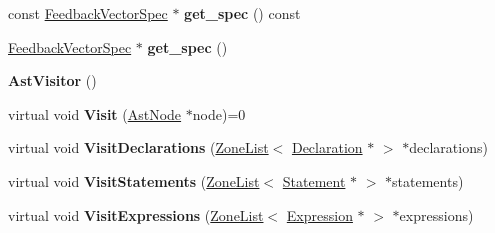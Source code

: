 \begin{DoxyCompactItemize}
\item 
const \hyperlink{classv8_1_1internal_1_1_feedback_vector_spec}{Feedback\+Vector\+Spec} $\ast$ {\bfseries get\+\_\+spec} () const \hypertarget{classv8_1_1internal_1_1_b_a_s_e___e_m_b_e_d_d_e_d_a0e8d746baeb21a506e5e6ed3d59b4a10}{}\label{classv8_1_1internal_1_1_b_a_s_e___e_m_b_e_d_d_e_d_a0e8d746baeb21a506e5e6ed3d59b4a10}

\item 
\hyperlink{classv8_1_1internal_1_1_feedback_vector_spec}{Feedback\+Vector\+Spec} $\ast$ {\bfseries get\+\_\+spec} ()\hypertarget{classv8_1_1internal_1_1_b_a_s_e___e_m_b_e_d_d_e_d_adf5f1c29b57883534f95ba9054dc1714}{}\label{classv8_1_1internal_1_1_b_a_s_e___e_m_b_e_d_d_e_d_adf5f1c29b57883534f95ba9054dc1714}

\item 
{\bfseries Ast\+Visitor} ()\hypertarget{classv8_1_1internal_1_1_b_a_s_e___e_m_b_e_d_d_e_d_a5c7d20cb9616d4aded102819748eef52}{}\label{classv8_1_1internal_1_1_b_a_s_e___e_m_b_e_d_d_e_d_a5c7d20cb9616d4aded102819748eef52}

\item 
virtual void {\bfseries Visit} (\hyperlink{classv8_1_1internal_1_1_ast_node}{Ast\+Node} $\ast$node)=0\hypertarget{classv8_1_1internal_1_1_b_a_s_e___e_m_b_e_d_d_e_d_a31e2e076d45932ac23383921e4e3bfe2}{}\label{classv8_1_1internal_1_1_b_a_s_e___e_m_b_e_d_d_e_d_a31e2e076d45932ac23383921e4e3bfe2}

\item 
virtual void {\bfseries Visit\+Declarations} (\hyperlink{classv8_1_1internal_1_1_zone_list}{Zone\+List}$<$ \hyperlink{classv8_1_1internal_1_1_declaration}{Declaration} $\ast$ $>$ $\ast$declarations)\hypertarget{classv8_1_1internal_1_1_b_a_s_e___e_m_b_e_d_d_e_d_ae92ef664fe970fe665c8c0a3dae5d4f5}{}\label{classv8_1_1internal_1_1_b_a_s_e___e_m_b_e_d_d_e_d_ae92ef664fe970fe665c8c0a3dae5d4f5}

\item 
virtual void {\bfseries Visit\+Statements} (\hyperlink{classv8_1_1internal_1_1_zone_list}{Zone\+List}$<$ \hyperlink{classv8_1_1internal_1_1_statement}{Statement} $\ast$ $>$ $\ast$statements)\hypertarget{classv8_1_1internal_1_1_b_a_s_e___e_m_b_e_d_d_e_d_a06e33b8df3b8bd142ddcbc01036fe141}{}\label{classv8_1_1internal_1_1_b_a_s_e___e_m_b_e_d_d_e_d_a06e33b8df3b8bd142ddcbc01036fe141}

\item 
virtual void {\bfseries Visit\+Expressions} (\hyperlink{classv8_1_1internal_1_1_zone_list}{Zone\+List}$<$ \hyperlink{classv8_1_1internal_1_1_expression}{Expression} $\ast$ $>$ $\ast$expressions)\hypertarget{classv8_1_1internal_1_1_b_a_s_e___e_m_b_e_d_d_e_d_ae51b3a7ba2be8eed3190faf95253d085}{}\label{classv8_1_1internal_1_1_b_a_s_e___e_m_b_e_d_d_e_d_ae51b3a7ba2be8eed3190faf95253d085}


\end{DoxyCompactItemize}
